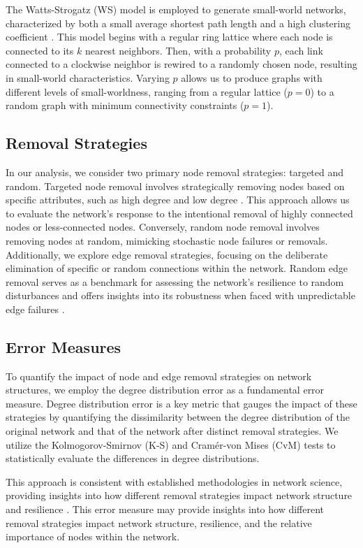 \documentclass[conference]{IEEEtran} %
\begin{document}
The Watts-Strogatz (WS) model is employed to generate small-world networks, characterized by both a small average shortest path length and a high clustering coefficient \cite{watts1998collective}. This model begins with a regular ring lattice where each node is connected to its $k$ nearest neighbors. Then, with a probability $p$, each link connected to a clockwise neighbor is rewired to a randomly chosen node, resulting in small-world characteristics. Varying $p$ allows us to produce graphs with different levels of small-worldness, ranging from a regular lattice ($p=0$) to a random graph with minimum connectivity constraints ($p=1$).

\subsection{Removal Strategies} 
In our analysis, we consider two primary node removal strategies: targeted and random. Targeted node removal involves strategically removing nodes based on specific attributes, such as high degree and low degree \cite{albert2000error}. This approach allows us to evaluate the network's response to the intentional removal of highly connected nodes or less-connected nodes. Conversely, random node removal involves removing nodes at random, mimicking stochastic node failures or removals. Additionally, we explore edge removal strategies, focusing on the deliberate elimination of specific or random connections within the network. Random edge removal serves as a benchmark for assessing the network's resilience to random disturbances and offers insights into its robustness when faced with unpredictable edge failures \cite{bellingeri2020comparative}.

\subsection{Error Measures} 
To quantify the impact of node and edge removal strategies on network structures, we employ the degree distribution error as a fundamental error measure. Degree distribution error is a key metric that gauges the impact of these strategies by quantifying the dissimilarity between the degree distribution of the original network and that of the network after distinct removal strategies. We utilize the Kolmogorov-Smirnov (K-S) and Cramér-von Mises (CvM) tests to statistically evaluate the differences in degree distributions.

This approach is consistent with established methodologies in network science, providing insights into how different removal strategies impact network structure and resilience \cite{newman2018networks, estrada2005subgraph, clauset2009power, albert2000error, albert2002statistical}. This error measure may provide insights into how different removal strategies impact network structure, resilience, and the relative importance of nodes within the network. 
\end{document}
